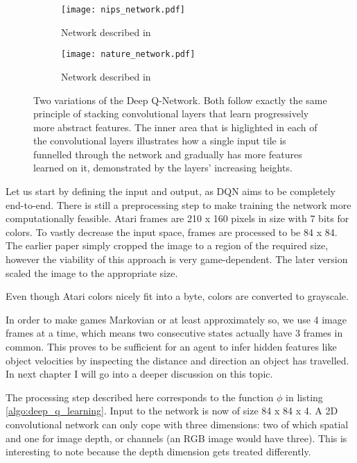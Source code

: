 \begin{figure}[h]
\center
\begin{subfigure}[b]{.49\textwidth}
  \centering
  \texttt{[image: nips\_network.pdf]}
  \vspace{.1\baselineskip}
  \caption{Network described in \cite{Mnih2013}}
  \label{fig:nips_network}
\end{subfigure}
\begin{subfigure}[b]{.49\textwidth}
  \centering
  \texttt{[image: nature\_network.pdf]}
  \vspace{.1\baselineskip}
  \caption{Network described in \cite{Mnih2015}}
  \label{fig:nature_network}
\end{subfigure}
\caption[Original Deep Q-Networks]{
Two variations of the Deep Q-Network.
Both follow exactly the same principle
of stacking convolutional layers
that learn progressively more abstract features.
The inner area that is higlighted in each of the convolutional layers
illustrates how a single input tile is funnelled through the network
and gradually has more features learned on it,
demonstrated by the layers' increasing heights.
}
\label{fig:dqn_networks}
\end{figure}

Let us start by defining the input and output,
as DQN aims to be completely end-to-end.
There is still a preprocessing step to make training
the network more computationally feasible.
Atari frames are 210 x 160 pixels in size
with 7 bits for colors.
To vastly decrease the input space,
frames are processed to be 84 x 84.
The earlier paper simply cropped the image to
a region of the required size,
however the viability of this approach
is very game-dependent.
The later version scaled the image to the appropriate size.

Even though Atari colors nicely fit into a byte,
colors are converted to grayscale.

In order to make games Markovian or at least approximately so,
we use 4 image frames at a time,
which means two consecutive states
actually have 3 frames in common.
This proves to be sufficient for an agent to infer hidden features
like object velocities by inspecting the distance and direction
an object has travelled.
In next chapter I will go into a deeper discussion on this topic.

The processing step described here corresponds to
the function $\phi$ in listing \ref{algo:deep_q_learning}.
Input to the network is now of size 84 x 84 x 4.
A 2D convolutional network can only cope with three dimensions:
two of which spatial and one for image depth,
or channels (an RGB image would have three).
This is interesting to note because the depth dimension
gets treated differently.

